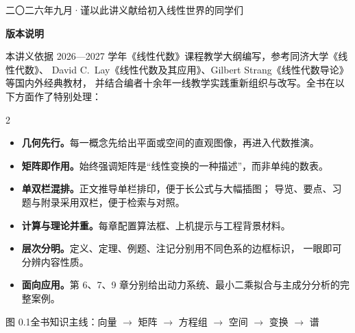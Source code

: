 \documentclass[11pt,a4paper,openany]{ctexbook}
\renewcommand{\cleardoublepage}{\clearpage}
\begin{document}
\begin{titlepage}
\vfill
{\sffamily\fontsize{10.5}{15}\selectfont\color{inkl}
 二〇二六年九月\quad·\quad 谨以此讲义献给初入线性世界的同学们\par}
\vspace{0.15cm}
\end{titlepage}

\cleardoublepage
\thispagestyle{empty}
\vspace*{1.6cm}
{\sffamily\bfseries\Large\color{qing}版本说明\par}
\vspace{4pt}\noindent{\color{qing}\rule{\textwidth}{0.8pt}}\par
\vspace{0.6cm}

本讲义依据 2026—2027 学年《线性代数》课程教学大纲编写，参考同济大学《线性代数》、
David C.\ Lay《线性代数及其应用》、Gilbert Strang《线性代数导论》等国内外经典教材，
并结合编者十余年一线教学实践重新组织与改写。全书在以下方面作了特别处理：

\begin{multicols}{2}
\sffamily\small{}
\begin{itemize}[leftmargin=1.5em]
\item[$\diamond$] \textbf{几何先行。}每一概念先给出平面或空间的直观图像，再进入代数推演。
\item[$\diamond$] \textbf{矩阵即作用。}始终强调矩阵是“线性变换的一种描述”，而非单纯的数表。
\item[$\diamond$] \textbf{单双栏混排。}正文推导单栏排印，便于长公式与大幅插图；
      导览、要点、习题与附录采用双栏，便于检索与对照。
\item[$\diamond$] \textbf{计算与理论并重。}每章配置算法框、上机提示与工程背景材料。
\item[$\diamond$] \textbf{层次分明。}定义、定理、例题、注记分别用不同色系的边框标识，
      一眼即可分辨内容性质。
\item[$\diamond$] \textbf{面向应用。}第 6、7、9 章分别给出动力系统、最小二乘拟合与主成分分析的完整案例。
\end{itemize}
\end{multicols}

\vspace{0.3cm}
\begin{center}
\end{center}
\vspace{0.2cm}
{\centering\sffamily\small\color{inkl}图 0.1\quad 全书知识主线：向量 $\to$ 矩阵 $\to$ 方程组 $\to$ 空间 $\to$ 变换 $\to$ 谱\par}
\end{document}
